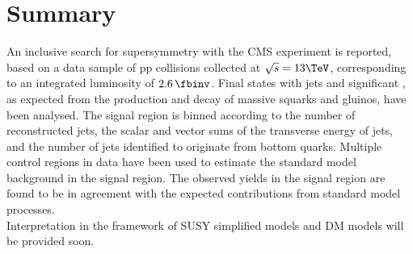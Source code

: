 \section{Summary}
\label{sec:summary}

An inclusive search for supersymmetry with the CMS experiment is
reported, based on a data sample of pp collisions collected at
$\sqrt{s} = 13\TeV$, corresponding to an integrated luminosity of $2.6\, \fbinv$. 
Final states with jets and significant \met, as
expected from the production and decay of massive squarks and gluinos,
have been analysed.  The signal region is binned according to the
number of reconstructed jets, the scalar and vector sums of the
transverse energy of jets, and the number of jets identified to
originate from bottom quarks. 
Multiple control regions in data have been used to estimate the standard model background in 
the signal region. 
The observed yields in the signal region are found to be in agreement with
the expected contributions from standard model processes. \\
Interpretation in the framework of SUSY simplified models and DM models will be provided soon. 

